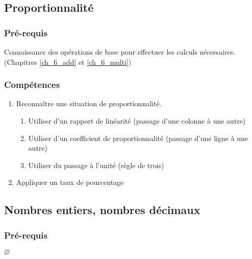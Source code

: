 \subsection{Proportionnalité}\label{ch_6_proba}

\subsubsection*{Pré-requis}

Connaissance des opérations de base pour effectuer les calculs nécessaires. (Chapitres \ref{ch_6_add} et \ref{ch_6_multi})


\subsubsection*{Compétences}

\begin{enumerate}

	\item Reconnaître une situation de proportionnalité.

		\begin{enumerate}
			\item Utiliser d'un rapport de linéarité (passage d'une colonne à une autre)
			\item Utiliser d'un coefficient de proportionnalité (passage d'une ligne à une autre) 
			\item Utiliser du passage à l'unité (règle de trois)		
		\end{enumerate}
	\item Appliquer un taux de pourcentage
\end{enumerate}


\subsection{Nombres entiers, nombres décimaux}\label{ch_6_nombres}

\subsubsection*{Pré-requis}

$\varnothing$

